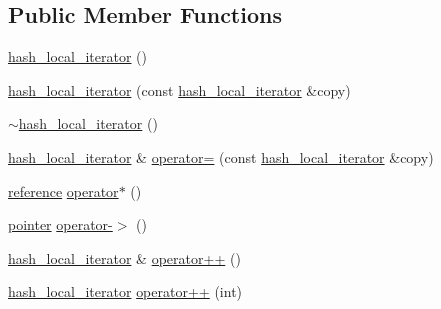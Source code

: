 \subsection*{Public Member Functions}
\begin{DoxyCompactItemize}
\item 
\hyperlink{classhash__local__iterator_ad28648ea1f8f17c22a67cc193827ed9d}{hash\+\_\+local\+\_\+iterator} ()
\item 
\hyperlink{classhash__local__iterator_a7f00003a484d30d039b5a2a85601884a}{hash\+\_\+local\+\_\+iterator} (const \hyperlink{classhash__local__iterator}{hash\+\_\+local\+\_\+iterator} \&copy)
\item 
\hyperlink{classhash__local__iterator_a4cce760601abf065336c37358edfcda4}{$\sim$hash\+\_\+local\+\_\+iterator} ()
\item 
\hyperlink{classhash__local__iterator}{hash\+\_\+local\+\_\+iterator} \& \hyperlink{classhash__local__iterator_a926995fe38412146e8993e28a9acfb9d}{operator=} (const \hyperlink{classhash__local__iterator}{hash\+\_\+local\+\_\+iterator} \&copy)
\item 
\hyperlink{classhash__local__iterator_a1d2a04128228b447eb0c026e5004f247}{reference} \hyperlink{classhash__local__iterator_a4bb84040df79578f9102b2d29dbfb9a7}{operator$\ast$} ()
\item 
\hyperlink{classhash__local__iterator_a2916a4b3cab394878c6862b263e5841c}{pointer} \hyperlink{classhash__local__iterator_aa741eeefd29d79162f74d38a26accade}{operator-\/$>$} ()
\item 
\hyperlink{classhash__local__iterator}{hash\+\_\+local\+\_\+iterator} \& \hyperlink{classhash__local__iterator_a2c18a4871886170d5578ee9d170cb4b3}{operator++} ()
\item 
\hyperlink{classhash__local__iterator}{hash\+\_\+local\+\_\+iterator} \hyperlink{classhash__local__iterator_aa0adcb7657297f054be1ece32dec6154}{operator++} (int)
\end{DoxyCompactItemize}
